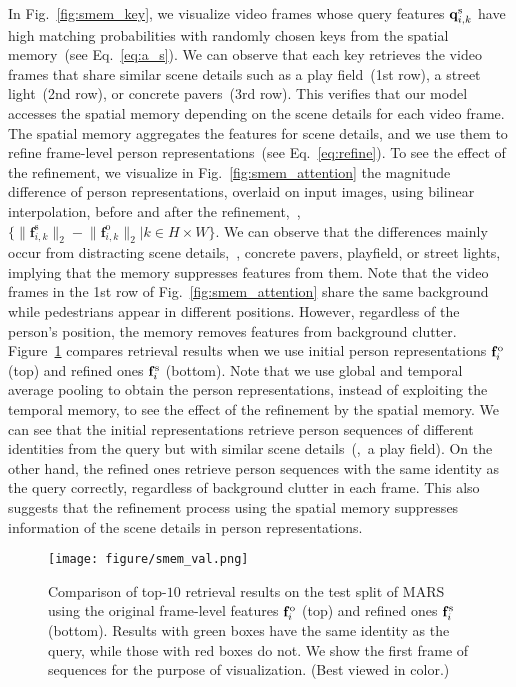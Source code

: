 \documentclass[10pt,twocolumn,letterpaper]{article}
\begin{document}
		
			In Fig.~\ref{fig:smem_key}, we visualize video frames whose query features $\mathbf{q}^{\text s}_{i,k}$ have high matching probabilities with randomly chosen keys from the spatial memory~(see Eq.~\eqref{eq:a_s}). We can observe that each key retrieves the video frames that share similar scene details such as a play field~(1st row), a street light~(2nd row), or concrete pavers~(3rd row). This verifies that our model accesses the spatial memory depending on the scene details for each video frame. The spatial memory aggregates the features for scene details, and we use them to refine frame-level person representations~(see Eq.~\eqref{eq:refine}). To see the effect of the refinement, we visualize in Fig.~\ref{fig:smem_attention} the magnitude difference of person representations, overlaid on input images, using bilinear interpolation, before and after the refinement,~\ie, $\big\{\lVert \mathbf{f}^\text{s}_{i,k} \rVert_2 - \lVert \mathbf{f}^\text{o}_{i,k} \rVert_2 \big| k \in H \times W \big\}$. We can observe that the differences mainly occur from distracting scene details,~\eg, concrete pavers, playfield, or street lights, implying that the memory suppresses features from them. Note that the video frames in the 1st row of Fig.~\ref{fig:smem_attention} share the same background while pedestrians appear in different positions. However, regardless of the person's position, the memory removes features from background clutter. Figure~\ref{fig:smem_val} compares retrieval results when we use initial person representations $\mathbf{f}^{\text o}_i$ (top) and refined ones $\mathbf{f}^{\text s}_i$ (bottom). Note that we use global and temporal average pooling to obtain the person representations, instead of exploiting the temporal memory, to see the effect of the refinement by the spatial memory. We can see that the initial representations retrieve person sequences of different identities from the query but with similar scene details~(\eg,~a play field). On the other hand, the refined ones retrieve person sequences with the same identity as the query correctly, regardless of background clutter in each frame. This also suggests that the refinement process using the spatial memory suppresses information of the scene details in person representations.
			
		
		\begin{figure}[t]
	    	\centering
	    	\texttt{[image: figure/smem\_val.png]}
	    	\caption{Comparison of top-$10$ retrieval results on the test split of MARS~\cite{zheng2016mars} using the original frame-level features $\mathbf{f}^{\text o}_i$ (top) and refined ones $\mathbf{f}^{\text s}_i$ (bottom). Results with green boxes have the same identity as the query, while those with red boxes do not. We show the first frame of sequences for the purpose of visualization. (Best viewed in color.)}
	    	\label{fig:smem_val}
	    	\vspace{-0.5cm}
	    \end{figure}
		
\end{document}
